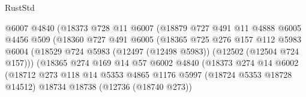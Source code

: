 \begin{lexlean}{RustStd}
\begin{coremodule}
                                  @6007
                                  @4840
                                  (@18373
                                    @728
                                    @11
                                    @6007
                                    (@18879
                                      @727
                                      @491
                                      @11
                                      @4888
                                      @6005
                                      @4456
                                      @509
                                      (@18360
                                        @727
                                        @491
                                        @6005
                                        (@18365
                                          @725
                                          @276
                                          @157
                                          @112
                                          @5983
                                          @6004
                                          (@18529
                                            @724
                                            @5983
                                            (@12497 (@12498 @5983))
                                            (@12502 (@12504 @724 @157)))
                                          (@18365
                                            @274
                                            @169
                                            @14
                                            @57
                                            @6002
                                            @4840
                                            (@18373
                                              @274
                                              @14
                                              @6002
                                              (@18712
                                                @273
                                                @118
                                                @14
                                                @5353
                                                @4865
                                                @1176
                                                @5997
                                                (@18724 @5353 @18728 @14512)
                                                @18734
                                                @18738
                                                (@12736 (@18740 @273))

\end{coremodule}
\end{lexlean}
